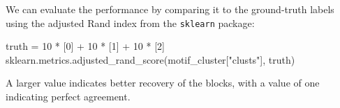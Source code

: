 \documentclass{article}
\begin{document}
We can evaluate the performance by comparing it to the ground-truth
labels using the adjusted Rand index
from the \texttt{sklearn} package:

\begin{pyconsole}
truth = 10 * [0] + 10 * [1] + 10 * [2]
sklearn.metrics.adjusted_rand_score(motif_cluster["clusts"], truth)
\end{pyconsole}

A larger value indicates better recovery of the blocks,
with a value of one indicating perfect agreement.






\end{document}
